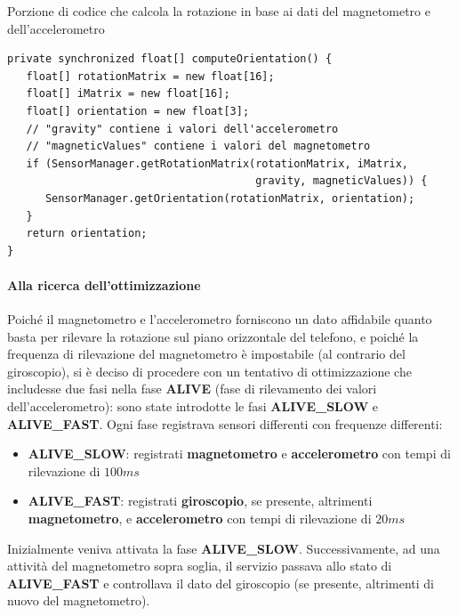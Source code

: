 \documentclass[a4paper,10pt]{memoir}
\begin{document}
\begin{listing}[H]
\caption{Porzione di codice che calcola la rotazione in base ai dati del magnetometro e dell'accelerometro}
\begin{verbatim}
private synchronized float[] computeOrientation() {
   float[] rotationMatrix = new float[16];
   float[] iMatrix = new float[16];
   float[] orientation = new float[3];
   // "gravity" contiene i valori dell'accelerometro
   // "magneticValues" contiene i valori del magnetometro
   if (SensorManager.getRotationMatrix(rotationMatrix, iMatrix,
                                       gravity, magneticValues)) {
      SensorManager.getOrientation(rotationMatrix, orientation);
   }
   return orientation;
}
\end{verbatim}
\end{listing}

\paragraph{Alla ricerca dell'ottimizzazione} Poiché il magnetometro e l'accelerometro forniscono un dato affidabile quanto basta per rilevare la rotazione sul piano orizzontale del telefono, e poiché la frequenza di rilevazione del magnetometro è impostabile (al contrario del giroscopio), si è deciso di procedere con un tentativo di ottimizzazione che includesse due fasi nella fase \textbf{ALIVE} (fase di rilevamento dei valori dell'accelerometro): sono state introdotte le fasi \textbf{ALIVE\_SLOW} e \textbf{ALIVE\_FAST}. Ogni fase registrava sensori differenti con frequenze differenti:

\begin{itemize}
\item \textbf{ALIVE\_SLOW}: registrati \textbf{magnetometro} e \textbf{accelerometro} con tempi di rilevazione di $100ms$
\item \textbf{ALIVE\_FAST}: registrati \textbf{giroscopio}, se presente, altrimenti \textbf{magnetometro}, e \textbf{accelerometro} con tempi di rilevazione di $20ms$
\end{itemize}

Inizialmente veniva attivata la fase \textbf{ALIVE\_SLOW}. Successivamente, ad una attività del magnetometro sopra soglia, il servizio passava allo stato di \textbf{ALIVE\_FAST} e controllava il dato del giroscopio (se presente, altrimenti di nuovo del magnetometro).
\end{document}
